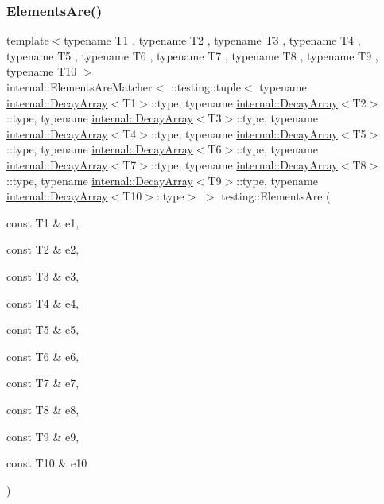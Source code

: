\subsubsection{\texorpdfstring{ElementsAre()}{ElementsAre()}\hspace{0.1cm}{\footnotesize\ttfamily [11/11]}}
{\footnotesize\ttfamily template$<$typename T1 , typename T2 , typename T3 , typename T4 , typename T5 , typename T6 , typename T7 , typename T8 , typename T9 , typename T10 $>$ \\
internal\+::\+Elements\+Are\+Matcher$<$ \+::testing\+::tuple$<$ typename \mbox{\hyperlink{structtesting_1_1internal_1_1_decay_array}{internal\+::\+Decay\+Array}}$<$T1$>$\+::type, typename \mbox{\hyperlink{structtesting_1_1internal_1_1_decay_array}{internal\+::\+Decay\+Array}}$<$T2$>$\+::type, typename \mbox{\hyperlink{structtesting_1_1internal_1_1_decay_array}{internal\+::\+Decay\+Array}}$<$T3$>$\+::type, typename \mbox{\hyperlink{structtesting_1_1internal_1_1_decay_array}{internal\+::\+Decay\+Array}}$<$T4$>$\+::type, typename \mbox{\hyperlink{structtesting_1_1internal_1_1_decay_array}{internal\+::\+Decay\+Array}}$<$T5$>$\+::type, typename \mbox{\hyperlink{structtesting_1_1internal_1_1_decay_array}{internal\+::\+Decay\+Array}}$<$T6$>$\+::type, typename \mbox{\hyperlink{structtesting_1_1internal_1_1_decay_array}{internal\+::\+Decay\+Array}}$<$T7$>$\+::type, typename \mbox{\hyperlink{structtesting_1_1internal_1_1_decay_array}{internal\+::\+Decay\+Array}}$<$T8$>$\+::type, typename \mbox{\hyperlink{structtesting_1_1internal_1_1_decay_array}{internal\+::\+Decay\+Array}}$<$T9$>$\+::type, typename \mbox{\hyperlink{structtesting_1_1internal_1_1_decay_array}{internal\+::\+Decay\+Array}}$<$T10$>$\+::type$>$ $>$ testing\+::\+Elements\+Are (\begin{DoxyParamCaption}\item[{const T1 \&}]{e1,  }\item[{const T2 \&}]{e2,  }\item[{const T3 \&}]{e3,  }\item[{const T4 \&}]{e4,  }\item[{const T5 \&}]{e5,  }\item[{const T6 \&}]{e6,  }\item[{const T7 \&}]{e7,  }\item[{const T8 \&}]{e8,  }\item[{const T9 \&}]{e9,  }\item[{const T10 \&}]{e10 }\end{DoxyParamCaption})\hspace{0.3cm}{\ttfamily [inline]}}

